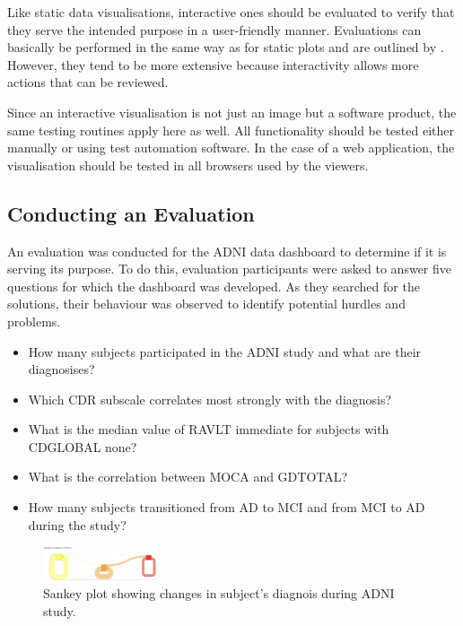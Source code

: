\documentclass[11pt]{article}
\begin{document}
Like static data visualisations, interactive ones should be evaluated to verify that they serve the intended purpose in a user-friendly manner. Evaluations can basically be performed in the same way as for static plots and are outlined by \textcite{weibel_fundamentals_2021}. However, they tend to be more extensive because interactivity allows more actions that can be reviewed.

Since an interactive visualisation is not just an image but a software product, the same testing routines apply here as well. All functionality should be tested either manually or using test automation software. In the case of a web application, the visualisation should be tested in all browsers used by the viewers.

\subsection{Conducting an Evaluation}

An evaluation was conducted for the ADNI data dashboard to determine if it is serving its purpose. To do this, evaluation participants were asked to answer five questions for which the dashboard was developed. As they searched for the solutions, their behaviour was observed to identify potential hurdles and problems.

\begin{itemize}
    \item How many subjects participated in the ADNI study and what are their diagnosises?
    \item Which CDR subscale correlates most strongly with the diagnosis?
    \item What is the median value of RAVLT immediate for subjects with CDGLOBAL none?
    \item What is the correlation between MOCA and GDTOTAL?
    \item How many subjects transitioned from AD to MCI and from MCI to AD during the study?
\end{itemize}

\begin{figure}
    \includegraphics[width=0.3\textwidth]{./sankey.png}
    \caption{Sankey plot showing changes in subject's diagnois during ADNI study.}
    \label{sankey}
\end{figure}
\end{document}

